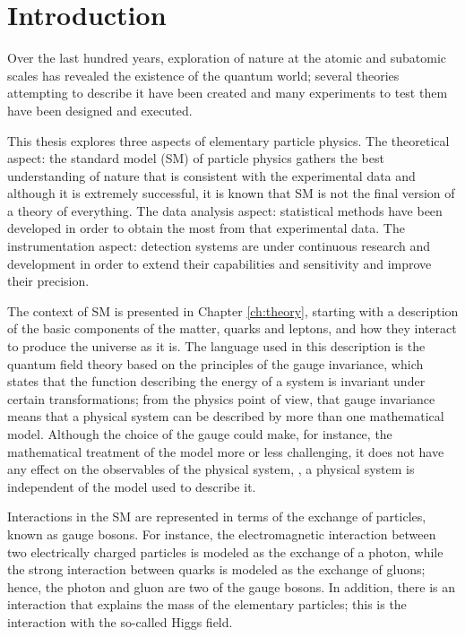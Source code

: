 \chapter{Introduction}
\label{ch:intro}

Over the last hundred years, exploration of nature at the atomic and subatomic scales has revealed the existence of the quantum world; several theories attempting to describe it have been created and many experiments to test them have been designed and executed.

This thesis explores three aspects of elementary particle physics. The theoretical aspect: the standard model (SM) of particle physics gathers the best understanding of nature that is consistent with the experimental data and although it is extremely successful, it is known that SM is not the final version of a theory of everything. The data analysis aspect: statistical methods have been developed in order to obtain the most from that experimental data. The instrumentation aspect: detection systems are under continuous research and development in order to extend their capabilities and sensitivity and improve their precision. 

The context of SM is presented in Chapter \ref{ch:theory}, starting with a description of the basic components of the matter, quarks and leptons, and how they interact to produce the universe as it is. The language used in this description is the quantum field theory based on the principles of the gauge invariance, which states that the function describing the energy of a system is invariant under certain transformations; from the physics point of view, that gauge invariance means that a physical system can be described by more than one mathematical model. Although the choice of the gauge could make, for instance, the mathematical treatment of the model more or less challenging, it does not have any effect on the observables of the physical system, \ie, a physical system is independent of the model used to describe it.

Interactions in the SM are represented in terms of the exchange of particles, known as gauge bosons. For instance, the electromagnetic interaction between two electrically charged particles is modeled as the exchange of a photon, while the strong interaction between quarks is modeled as the exchange of gluons; hence, the photon and gluon are two of the gauge bosons. In addition, there is an interaction that explains the mass of the elementary particles; this is the interaction with the so-called Higgs field.    

